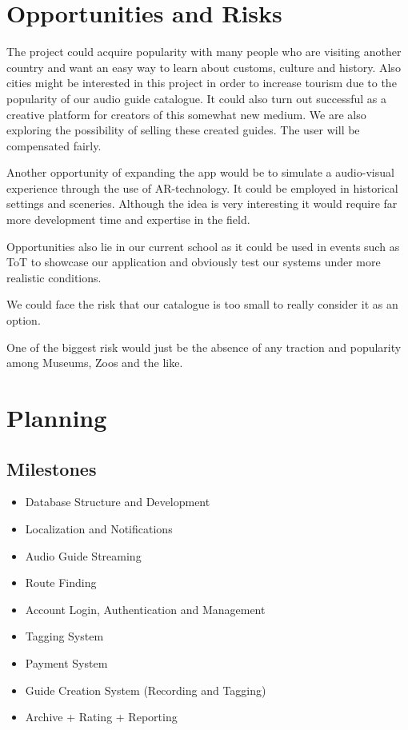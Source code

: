 \documentclass[12pt]{article}
\theoremstyle{definition}
\newenvironment{text}{
}{}
\begin{document}
\pagebreak
\section{Opportunities and Risks}
\begin{text}
The project could acquire popularity with many people who are visiting another country and want an easy way to learn about customs, culture and history.
Also cities might be interested in this project in order to increase tourism due to the popularity of our audio guide catalogue.
It could also turn out successful as a creative platform for creators of this somewhat new medium. We are also exploring the possibility of selling these created guides. The user will be compensated fairly.\newline
 
Another opportunity of expanding the app would be to simulate a audio-visual experience through the use of AR-technology. It could be employed in historical settings and sceneries. Although the idea is very interesting it would require far more development time and expertise in the field.\newline

Opportunities also lie in our current school as it could be used in events such as ToT to showcase our application and obviously test our systems under more realistic conditions.
 
We could face the risk that our catalogue is too small to really consider it as an option.\newline 
 
One of the biggest risk would just be the absence of any traction and popularity among Museums, Zoos and the like. \newline
 
\end{text}
 
\pagebreak
\section{Planning}

\subsection{Milestones}
\begin{itemize}
\item Database Structure and Development
\item Localization and Notifications
\item Audio Guide Streaming
\item Route Finding
\item Account Login, Authentication and Management
\item Tagging System
\item Payment System
\item Guide Creation System (Recording and Tagging)
\item Archive + Rating + Reporting
\end{itemize}
\end{document}
